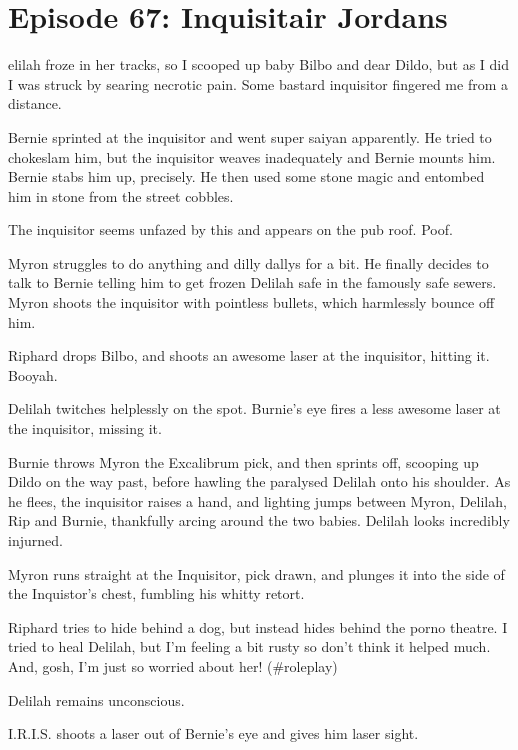 \section{Episode 67: Inquisitair Jordans}

\medskip

elilah froze in her tracks, so I scooped up baby Bilbo and dear Dildo, but as I did I was struck by searing necrotic pain. Some bastard inquisitor fingered me from a distance.\medskip

Bernie sprinted at the inquisitor and went super saiyan apparently. He tried to chokeslam him, but the inquisitor weaves inadequately and Bernie mounts him. Bernie stabs him up, precisely. He then used some stone magic and entombed him in stone from the street cobbles.\medskip

The inquisitor seems unfazed by this and appears on the pub roof. Poof.\medskip

Myron struggles to do anything and dilly dallys for a bit. He finally decides to talk to Bernie telling him to get frozen Delilah safe in the famously safe sewers. Myron shoots the inquisitor with pointless bullets, which harmlessly bounce off him.\medskip

Riphard drops Bilbo, and shoots an awesome laser at the inquisitor, hitting it. Booyah.\medskip

Delilah twitches helplessly on the spot. Burnie’s eye fires a less awesome laser at the inquisitor, missing it.\medskip

Burnie throws Myron the Excalibrum pick, and then sprints off, scooping up Dildo on the way past, before hawling the paralysed Delilah onto his shoulder. As he flees, the inquisitor raises a hand, and lighting jumps between Myron, Delilah, Rip and Burnie, thankfully arcing around the two babies. Delilah looks incredibly injurned.\medskip

Myron runs straight at the Inquisitor, pick drawn, and plunges it into the side of the Inquistor’s chest, fumbling his whitty retort.\medskip

Riphard tries to hide behind a dog, but instead hides behind the porno theatre. I tried to heal Delilah, but I’m feeling a bit rusty so don’t think it helped much. And, gosh, I’m just so worried about her! (\#roleplay)\medskip

Delilah remains unconscious.\medskip

I.R.I.S. shoots a laser out of Bernie’s eye and gives him laser sight.\medskip

